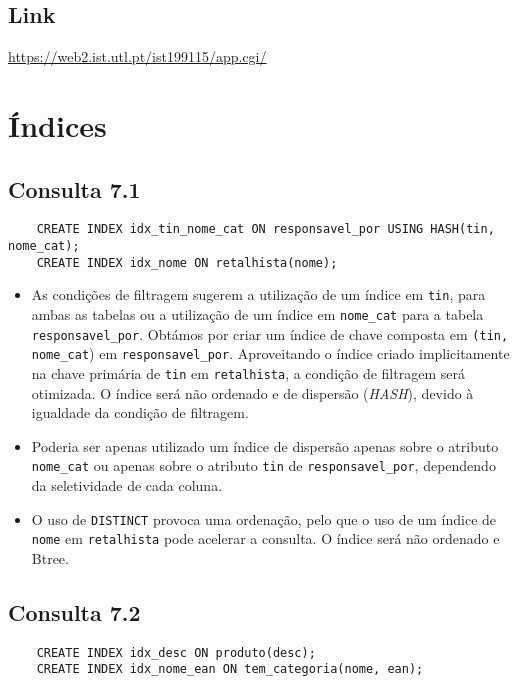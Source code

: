 \documentclass{article}
\begin{document}
\subsection{Link}
\href{https://web2.ist.utl.pt/ist199115/app.cgi/}{https://web2.ist.utl.pt/ist199115/app.cgi/}


\pagebreak

\section{Índices}
\subsection*{Consulta 7.1}
\begin{verbatim}
	CREATE INDEX idx_tin_nome_cat ON responsavel_por USING HASH(tin, nome_cat);
	CREATE INDEX idx_nome ON retalhista(nome);
\end{verbatim}

\begin{itemize}
	\item As condições de filtragem sugerem a utilização de um índice em \texttt{tin}, para ambas as tabelas ou a utilização de um índice em \texttt{nome\_cat} para a tabela \texttt{responsavel\_por}. Obtámos por criar um índice de chave composta em \texttt{(tin, nome\_cat}) em \texttt{responsavel\_por}. Aproveitando o índice criado implicitamente na chave primária de \texttt{tin} em \texttt{retalhista}, a condição de filtragem será otimizada. O índice será não ordenado e de dispersão (\emph{HASH}), devido à igualdade da condição de filtragem.
	\item Poderia ser apenas utilizado um índice de dispersão apenas sobre o atributo \texttt{nome\_cat} ou apenas sobre o atributo \texttt{tin} de \texttt{responsavel\_por}, dependendo da seletividade de cada coluna.
	\item O uso de \texttt{DISTINCT} provoca uma ordenação, pelo que o uso de um índice de \texttt{nome} em \texttt{retalhista} pode acelerar a consulta. O índice será não ordenado e Btree.
\end{itemize}

\subsection*{Consulta 7.2}
\begin{verbatim}
	CREATE INDEX idx_desc ON produto(desc);
	CREATE INDEX idx_nome_ean ON tem_categoria(nome, ean);
\end{verbatim}
\end{document}
